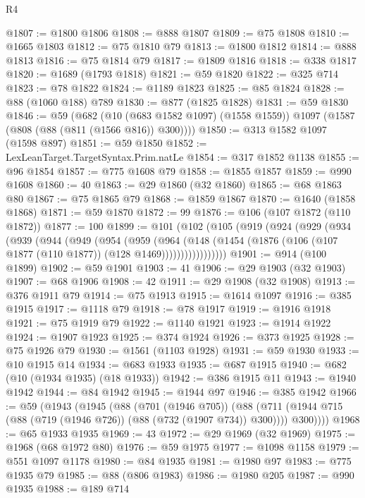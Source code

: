 \begin{lexlean}{R4}
\begin{coremodule}
@1807 := @1800 @1806
@1808 := @888 @1807
@1809 := @75 @1808
@1810 := @1665 @1803
@1812 := @75 @1810 @79
@1813 := @1800 @1812
@1814 := @888 @1813
@1816 := @75 @1814 @79
@1817 := @1809 @1816
@1818 := @338 @1817
@1820 := @1689 (@1793 @1818)
@1821 := @59 @1820
@1822 := @325 @714
@1823 := @78 @1822
@1824 := @1189 @1823
@1825 := @85 @1824
@1828 := @88 (@1060 @188) @789
@1830 := @877 (@1825 @1828)
@1831 := @59 @1830
@1846 := @59
    (@682
      (@10 (@683 @1582 @1097) (@1558 @1559))
      @1097
      (@1587 (@808 (@88 (@811 (@1566 @816)) @300))))
@1850 := @313 @1582 @1097 (@1598 @897)
@1851 := @59 @1850
@1852 := LexLeanTarget.TargetSyntax.Prim.natLe
@1854 := @317 @1852 @1138
@1855 := @96 @1854
@1857 := @775 @1608 @79
@1858 := @1855 @1857
@1859 := @990 @1608
@1860 := 40
@1863 := @29 @1860 (@32 @1860)
@1865 := @68 @1863 @80
@1867 := @75 @1865 @79
@1868 := @1859 @1867
@1870 := @1640 (@1858 @1868)
@1871 := @59 @1870
@1872 := 99
@1876 := @106 (@107 @1872 (@110 @1872))
@1877 := 100
@1899 := @101
    (@102
      (@105
        (@919
          (@924
            (@929
              (@934
                (@939
                  (@944
                    (@949
                      (@954
                        (@959
                          (@964
                            (@148
                              (@1454
                                (@1876 (@106 (@107 @1877 (@110 @1877)) (@128 @1469)))))))))))))))))
@1901 := @914 (@100 @1899)
@1902 := @59 @1901
@1903 := 41
@1906 := @29 @1903 (@32 @1903)
@1907 := @68 @1906
@1908 := 42
@1911 := @29 @1908 (@32 @1908)
@1913 := @376 @1911 @79
@1914 := @75 @1913
@1915 := @1614 @1097
@1916 := @385 @1915
@1917 := @1118 @79
@1918 := @78 @1917
@1919 := @1916 @1918
@1921 := @75 @1919 @79
@1922 := @1140 @1921
@1923 := @1914 @1922
@1924 := @1907 @1923
@1925 := @374 @1924
@1926 := @373 @1925
@1928 := @75 @1926 @79
@1930 := @1561 (@1103 @1928)
@1931 := @59 @1930
@1933 := @10 @1915 @14
@1934 := @683 @1933
@1935 := @687 @1915
@1940 := @682 (@10 (@1934 @1935) (@18 @1933))
@1942 := @386 @1915 @11
@1943 := @1940 @1942
@1944 := @84 @1942
@1945 := @1944 @97
@1946 := @385 @1942
@1966 := @59
    (@1943
      (@1945
        (@88
          (@701 (@1946 @705))
          (@88 (@711 (@1944 @715 (@88 (@719 (@1946 @726)) (@88 (@732 (@1907 @734)) @300)))) @300))))
@1968 := @65 @1933 @1935
@1969 := 43
@1972 := @29 @1969 (@32 @1969)
@1975 := @1968 (@68 @1972 @80)
@1976 := @59 @1975
@1977 := @1098 @1158
@1979 := @551 @1097 @1178
@1980 := @84 @1935
@1981 := @1980 @97
@1983 := @775 @1935 @79
@1985 := @88 (@806 @1983)
@1986 := @1980 @205
@1987 := @990 @1935
@1988 := @189 @714

\end{coremodule}
\end{lexlean}

